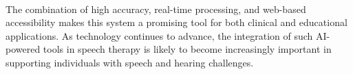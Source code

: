 \paragraph{}
The combination of high accuracy, real-time processing, and web-based accessibility makes this system a promising tool for both clinical and educational applications. As technology continues to advance, the integration of such AI-powered tools in speech therapy is likely to become increasingly important in supporting individuals with speech and hearing challenges.

